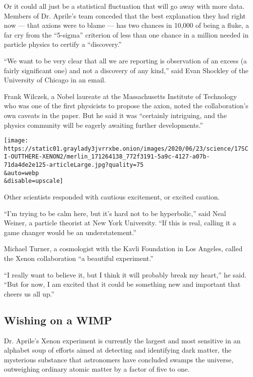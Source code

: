 Or it could all just be a statistical fluctuation that will go away with
more data. Members of Dr. Aprile's team conceded that the best
explanation they had right now --- that axions were to blame --- has two
chances in 10,000 of being a fluke, a far cry from the ``5-sigma''
criterion of less than one chance in a million needed in particle
physics to certify a ``discovery.''

``We want to be very clear that all we are reporting is observation of
an excess (a fairly significant one) and not a discovery of any kind,''
said Evan Shockley of the University of Chicago in an email.

Frank Wilczek, a Nobel laureate at the Massachusetts Institute of
Technology who was one of the first physicists to propose the axion,
noted the collaboration's own caveats in the paper. But he said it was
``certainly intriguing, and the physics community will be eagerly
awaiting further developments.''

\texttt{[image: https://static01.graylady3jvrrxbe.onion/images/2020/06/23/science/17SCI-OUTTHERE-XENON2/merlin\_171264138\_772f3191-5a9c-4127-a07b-71da4de2e125-articleLarge.jpg?quality=75\\\&auto=webp\\\&disable=upscale]}

Other scientists responded with cautious excitement, or excited caution.

``I'm trying to be calm here, but it's hard not to be hyperbolic,'' said
Neal Weiner, a particle theorist at New York University. ``If this is
real, calling it a game changer would be an understatement.''

Michael Turner, a cosmologist with the Kavli Foundation in Los Angeles,
called the Xenon collaboration ``a beautiful experiment.''

``I really want to believe it, but I think it will probably break my
heart,'' he said. ``But for now, I am excited that it could be something
new and important that cheers us all up.''

\hypertarget{wishing-on-a-wimp}{%
\subsection{Wishing on a WIMP}\label{wishing-on-a-wimp}}

Dr. Aprile's Xenon experiment is currently the largest and most
sensitive in an alphabet soup of efforts aimed at detecting and
identifying dark matter, the mysterious substance that astronomers have
concluded swamps the universe, outweighing ordinary atomic matter by a
factor of five to one.

